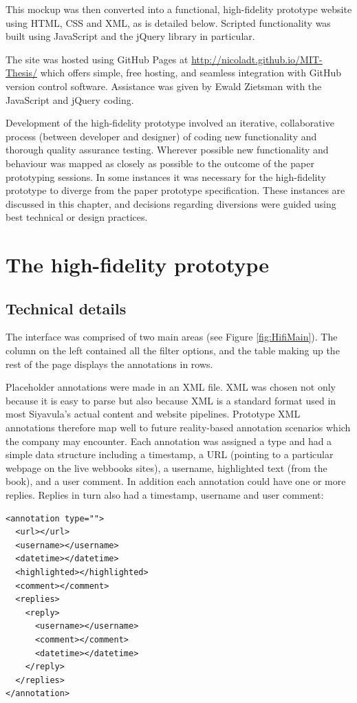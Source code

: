 This mockup was then converted into a functional, high-fidelity prototype website using HTML, CSS and XML, as is detailed below. Scripted functionality was built using JavaScript and the jQuery library in particular.  

The site was hosted using GitHub Pages \citep{GitHub} at \href{http://nicoladt.github.io/MIT-Thesis/}{http://nicoladt.github.io/MIT-Thesis/} which offers simple, free hosting, and seamless integration with GitHub version control software. Assistance was given by Ewald Zietsman with the JavaScript and jQuery coding.

Development of the high-fidelity prototype involved an iterative, collaborative process (between developer and designer) of coding new functionality and thorough quality assurance testing. Wherever possible new functionality and behaviour was mapped as closely as possible to the outcome of the paper prototyping sessions. In some instances it was necessary for the high-fidelity prototype to diverge from the paper prototype specification. These instances are discussed in this chapter, and decisions regarding diversions were guided using best technical or design practices. 

\section{The high-fidelity prototype}



\subsection{Technical details}
The interface was comprised of two main areas (see Figure \ref{fig:HifiMain}). The column on the left contained all the filter options, and the table making up the rest of the page displays the annotations in rows.

Placeholder annotations were made in an XML file. XML was chosen not only because it is easy to parse but also because XML is a standard format used in most Siyavula's actual content and website pipelines. Prototype XML annotations therefore map well to future reality-based annotation scenarios which the company may encounter. Each annotation was assigned a type and had a simple data structure including a timestamp, a URL (pointing to a particular webpage on the live webbooks sites), a username, highlighted text (from the book), and a user comment. In addition each annotation could have one or more replies. Replies in turn also had a timestamp, username and user comment: 
\begin{verbatim}
<annotation type="">
  <url></url>
  <username></username>
  <datetime></datetime>
  <highlighted></highlighted>
  <comment></comment>
  <replies>
    <reply>
      <username></username>
      <comment></comment>
      <datetime></datetime>
    </reply>
  </replies>
</annotation>
\end{verbatim}

